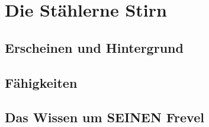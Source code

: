 \section{Die Stählerne Stirn}

\subsection{Erscheinen und Hintergrund}

\subsection{Fähigkeiten}


\subsection{Das Wissen um SEINEN Frevel}